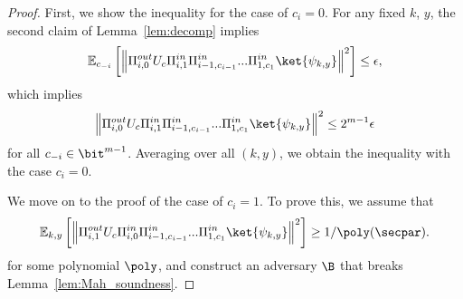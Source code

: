 \begin{proof}
First, we show the inequality for the case of $c_i=0$.
For any fixed $k$, $y$, the second claim of Lemma~\ref{lem:decomp} implies 
\begin{align*}
    &~~~\mathbb{E}_{c_{-i}}\left[\left\|\Pi_{i,0}^{out}U_c\Pi_{i,1}^{in}\Pi_{i-1,c_{i-1}}^{in}...\Pi_{1,c_1}^{in}\ket{\psi_{k,y}}\right\|^2\right] \leq \epsilon,
\end{align*}
which implies 
\begin{align*}
    \left\|\Pi_{i,0}^{out}U_c\Pi_{i,1}^{in}\Pi_{i-1,c_{i-1}}^{in}...\Pi_{1,c_1}^{in}\ket{\psi_{k,y}}\right\|^2\leq 2^{m-1}\epsilon
\end{align*}
for all $c_{-i}\in \bit^{m-1}$.
Averaging over all $(k,y)$, we obtain the inequality with the case $c_i=0$.

We move on to the proof of the case of $c_i=1$.
To prove this, we assume that 
\begin{align*}
     \mathbb{E}_{k,y}\left[\left\|\Pi_{i,1}^{out}U_c\Pi_{i,0}^{in}\Pi_{i-1,c_{i-1}}^{in}...\Pi_{1,c_1}^{in}\ket{\psi_{k,y}}\right\|^2\right]\geq 1/\poly(\secpar). 
\end{align*}
for some polynomial $\poly$, and construct an adversary $\B$ that breaks Lemma~\ref{lem:Mah_soundness}.


\end{proof}
